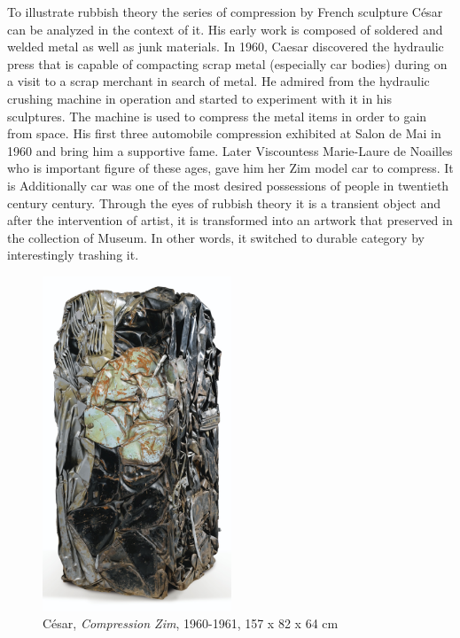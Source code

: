 To illustrate rubbish theory the series of compression by French sculpture César can be analyzed in the context of it. His early work is composed of soldered and welded metal as well as junk materials. In 1960, Caesar discovered the hydraulic press that is capable of compacting scrap metal (especially car bodies) during on a visit to a scrap merchant in search of metal. He admired from the hydraulic crushing machine in operation and started to experiment with it in his sculptures. The machine is used to compress the metal items in order to gain from space. His first three automobile compression exhibited at Salon de Mai in 1960 and bring him a supportive fame. Later Viscountess Marie-Laure de Noailles who is important figure of these ages, gave him her Zim model car to compress. It is 
 Additionally car was one of the most desired possessions of people in twentieth century century. Through the eyes of rubbish theory it is a transient object and after the intervention of artist, it is transformed into an artwork that preserved in the collection of Museum. In other words, it switched to durable category by interestingly trashing it. 


\begin{figure}[h!]
  \centering
  \includegraphics[height=10cm]{graphics/Cesar_Zim.jpg}
  \caption{César, \textit{Compression Zim}, 1960-1961, 157 x 82 x 64 cm}
  \label{fig:Cesar_Zim}
\end{figure}

